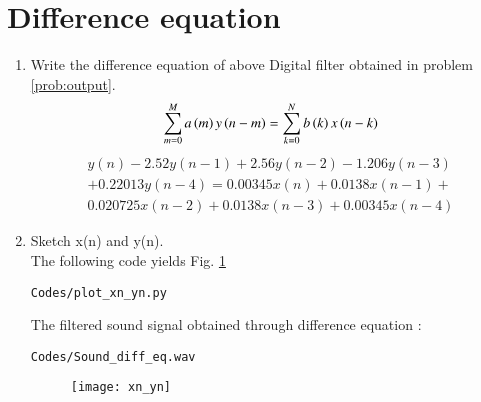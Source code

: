 \documentclass[journal,12pt,twocolumn]{IEEEtran}
\renewcommand\thesection{\arabic{section}}
\begin{document}
\section{Difference equation}
\begin{enumerate}[label=\thesection.\arabic*,ref=\thesection.\theenumi]
\item
\label{prob:diff_eq}
Write the difference equation of above Digital filter obtained in problem \ref{prob:output}.
\\
\solution
\begin{equation}
\label{eq:iir_filter_gen}
 \sum _{m=0}^{M}a\left(m\right)y\left(n-m\right)=\sum _{k=0}^{N}b\left(k\right)x\left(n-k\right)
\end{equation}
\begin{equation}
\label{eq:diff_eqn}
\begin{split}
y(n) - 2.52y(n-1) + 2.56y(n-2) - 1.206y(n-3)
\\
+ 0.22013y(n-4) = 0.00345x(n) + 0.0138x(n-1) +
\\
 0.020725x(n-2) + 0.0138x(n-3) + 0.00345x(n-4)
\end{split}
\end{equation}

\item
\label{prob:xnyn_plot1}
Sketch x(n) and y(n).
\\
\solution
The following code yields Fig. \ref{fig:xnyn}
\begin{lstlisting}
Codes/plot_xn_yn.py
\end{lstlisting}
The filtered sound signal obtained through difference equation :
\begin{lstlisting}
Codes/Sound_diff_eq.wav
\end{lstlisting}
\begin{figure}[!ht]
\begin{center}
\texttt{[image: xn\_yn]}
\end{center}
\label{fig:xnyn}    
\end{figure}
\end{enumerate}
\end{document}
